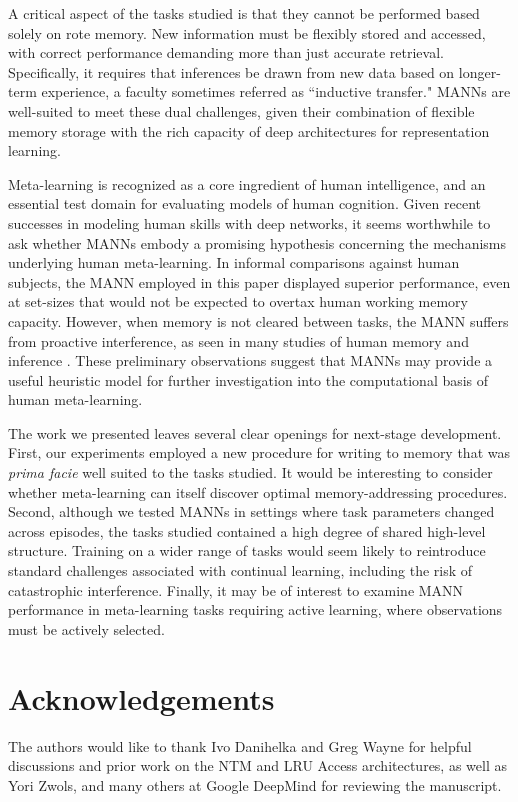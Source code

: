 \documentclass{article}
\begin{document}
A critical aspect of the tasks studied is that they cannot be performed based solely on rote memory. New information must be flexibly stored and accessed, with correct performance demanding more than just accurate retrieval. Specifically, it requires that inferences be drawn from new data based on longer-term experience, a faculty sometimes referred as ``inductive transfer."  MANNs are well-suited to meet these dual challenges, given their combination of flexible memory storage with the rich capacity of deep architectures for representation learning. 

Meta-learning is recognized as a core ingredient of human intelligence, and an essential test domain for evaluating models of human cognition. Given recent successes in modeling human skills with deep networks, it seems worthwhile to ask whether MANNs embody a promising hypothesis concerning the mechanisms underlying human meta-learning. In informal comparisons against human subjects, the MANN employed in this paper displayed superior performance, even at set-sizes that would not be expected to overtax human working memory capacity. However, when memory is not cleared between tasks, the MANN suffers from proactive interference, as seen in many studies of human memory and inference \cite{underwood1957interference}. These preliminary observations suggest that MANNs may provide a useful heuristic model for further investigation into the computational basis of human meta-learning. 

The work we presented leaves several clear openings for next-stage development. First, our experiments employed a new procedure for writing to memory that was \textit{prima facie} well suited to the tasks studied. It would be interesting to consider whether meta-learning can itself discover optimal memory-addressing procedures. Second, although we tested MANNs in settings where task parameters changed across episodes, the tasks studied contained a high degree of shared high-level structure. Training on a wider range of tasks would seem likely to reintroduce standard challenges associated with continual learning, including the risk of catastrophic interference. Finally, it may be of interest to examine MANN performance in meta-learning tasks requiring active learning, where observations must be actively selected. 

\clearpage

\section{Acknowledgements}
The authors would like to thank Ivo Danihelka and Greg Wayne for helpful discussions and prior work on the NTM and LRU Access architectures, as well as Yori Zwols, and many others at Google DeepMind for reviewing the manuscript.
\end{document}
